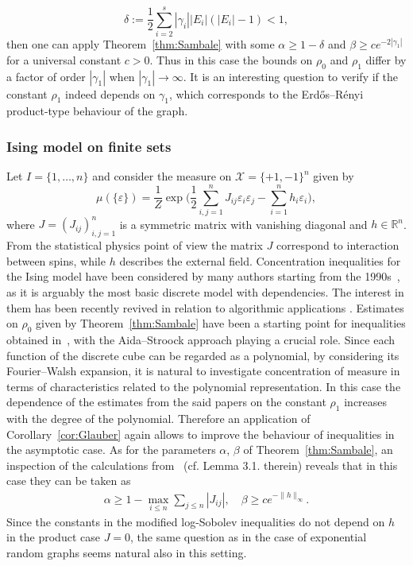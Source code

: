 \documentclass[a4paper]{amsart}
\theoremstyle{definition}
\theoremstyle{remark}
\numberwithin{equation}{section}
\newcommand*{\RR}{\mathbb{R}}
\begin{document}
    \begin{displaymath}
    \delta := \frac{1}{2}\sum_{i=2}^s |\gamma_i||E_i|(|E_i|-1) < 1,
    \end{displaymath}
    then one can apply Theorem~\ref{thm:Sambale} with some $\alpha \ge 1 - \delta$ and $\beta \ge ce^{-2|\gamma_1|}$ for a universal constant $c>0$. Thus in this case the bounds on $\rho_0$ and $\rho_1$ differ by a factor of order $|\gamma_1|$  when $|\gamma_1| \to \infty$. It is an interesting question to verify if the constant $\rho_1$ indeed depends on $\gamma_1$, which corresponds to the Erd\H{o}s--R\'enyi product-type behaviour of the graph.

\subsubsection{Ising model on finite sets} Let $I = \{1,\ldots,n\}$ and consider the measure on $\mathcal{X} = \{+1,-1\}^n$ given by
\begin{displaymath}
  \mu(\{\varepsilon\}) = \frac{1}{Z}\exp\Big(\frac{1}{2}\sum_{i,j=1}^n J_{ij}\varepsilon_i\varepsilon_j - \sum_{i=1}^n h_i\varepsilon_i\Big),
\end{displaymath}
where $J = (J_{ij})_{i,j=1}^n$ is a symmetric matrix with vanishing diagonal and $h \in \RR^n$. From the statistical physics point of view the matrix $J$ correspond to interaction between spins, while $h$ describes the external field. Concentration inequalities for the Ising model have been considered by many authors starting from the 1990s~\cite{MR2002993,MR3711609}, as it is arguably the most basic discrete model with dependencies. The interest in them has been recently  revived in relation to algorithmic applications \cite{MR3775918,2017arXiv171004170D,MR3873783}. Estimates on $\rho_0$ given by Theorem~\ref{thm:Sambale} have been a starting point for inequalities obtained in~\cite{gtze2018higher,MR3949267}, with the Aida--Stroock approach playing a crucial role. Since each function of the discrete cube can be regarded as a polynomial, by considering its Fourier--Walsh expansion, it is natural to investigate concentration of measure in terms of characteristics related to the polynomial representation. In this case  the dependence of the estimates from the said papers on the constant $\rho_1$ increases with the degree of the polynomial. Therefore an application of Corollary~\ref{cor:Glauber} again allows to improve the behaviour of inequalities in the asymptotic case. As for the parameters $\alpha$, $\beta$ of Theorem~\ref{thm:Sambale}, an inspection of the calculations from~\cite{gtze2018higher} (cf. Lemma 3.1. therein) reveals that in this case they can be taken as
\begin{align}\label{eq:Ising-constants}
\alpha \ge  1 - \max_{i\le n}\sum_{j\le n}|J_{ij}|,\quad \beta \ge ce^{-\|h\|_\infty}.
\end{align}
Since the constants in the modified log-Sobolev inequalities do not depend on $h$ in the product case $J= 0$, the same question as in the case of exponential random graphs seems natural also in this setting.
\end{document}
